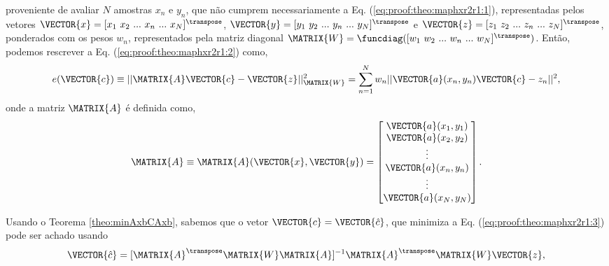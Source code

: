 \begin{myproofT}
proveniente de avaliar $N$ amostras $x_n$ e $y_n$, 
que não cumprem necessariamente a Eq. (\ref{eq:proof:theo:maphxr2r1:1}), 
representadas pelos vetores 
$\VECTOR{x}=[x_1~ x_2~ ...~ x_n~ ...~ x_N]^{\transpose}$,
$\VECTOR{y}=[y_1~ y_2~ ...~ y_n~ ...~ y_N]^{\transpose}$ e 
$\VECTOR{z}=[z_1~ z_2~ ...~ z_n~ ...~ z_N]^{\transpose}$,
ponderados com os pesos $w_n$, representados pela matriz diagonal $\MATRIX{W}=\funcdiag([w_1~ w_2~ ...~ w_n~ ...~ w_N]^{\transpose})$.
Então, podemos rescrever a Eq. (\ref{eq:proof:theo:maphxr2r1:2}) como,
\begin{equation}\label{eq:proof:theo:maphxr2r1:3}
e(\VECTOR{c}) \equiv ||\MATRIX{A}\VECTOR{c}-\VECTOR{z}||_{\MATRIX{W}}^2 =  \sum_{n=1}^{N} w_n||\VECTOR{a}(x_n,y_n)\VECTOR{c}-z_n||^2,
\end{equation}
onde a matriz $\MATRIX{A}$ é definida como,
\begin{equation}\label{eq:proof:maphxr2r1:4}
\MATRIX{A}\equiv \MATRIX{A}(\VECTOR{x},\VECTOR{y})=\begin{bmatrix}
\VECTOR{a}(x_1,y_1)\\
\VECTOR{a}(x_2,y_2)\\
\vdots\\
\VECTOR{a}(x_n,y_n)\\
\vdots\\
\VECTOR{a}(x_N,y_N)
\end{bmatrix}.
\end{equation}


Usando o Teorema \ref{theo:minAxbCAxb}, sabemos que o vetor $\VECTOR{c}=\VECTOR{\hat{c}}$,
que minimiza a Eq. (\ref{eq:proof:theo:maphxr2r1:3}) pode ser achado usando 
\begin{equation}\label{eq:proof:theo:maphxr2r1:5}
\VECTOR{\hat{c}}=[\MATRIX{A}^{\transpose}\MATRIX{W}\MATRIX{A}]^{-1}\MATRIX{A}^{\transpose}\MATRIX{W}\VECTOR{z},
\end{equation}
\end{myproofT}
